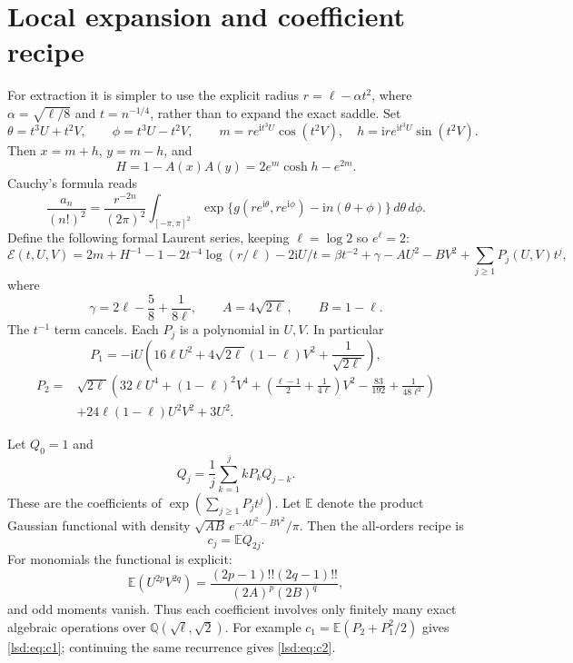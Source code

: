 \documentclass[11pt]{article}
\newcommand{\E}{\mathbb E}
\newcommand{\ii}{\mathrm i}
\theoremstyle{remark}\newtheorem{remark}{Remark}
\begin{document}
\section{Local expansion and coefficient recipe}
For extraction it is simpler to use the explicit radius
$r=\ell-\alpha t^2$, where $\alpha=\sqrt{\ell/8}$ and $t=n^{-1/4}$, rather than to expand the exact saddle.
Set
\[
 \theta=t^3U+t^2V,\qquad \phi=t^3U-t^2V,
 \qquad m=r e^{\ii t^3U}\cos(t^2V),\quad h=\ii r e^{\ii t^3U}\sin(t^2V).
\]
Then $x=m+h$, $y=m-h$, and
\[
 H=1-A(x)A(y)=2e^m\cosh h-e^{2m}.
\]
Cauchy's formula reads
\[
 \frac{a_n}{(n!)^2}=\frac{r^{-2n}}{(2\pi)^2}
 \int_{[-\pi,\pi]^2}\exp\{g(re^{\ii\theta},re^{\ii\phi})-\ii n(\theta+\phi)\}\,d\theta\,d\phi.
\]
Define the following formal Laurent series, keeping $\ell=\log2$ so $e^\ell=2$:
\begin{equation}\label{lsd:eq:formal}
 \mathcal E(t,U,V)=2m+H^{-1}-1
       -2t^{-4}\log(r/\ell)-2\ii U/t
 =\beta t^{-2}+\gamma-AU^2-BV^2+\sum_{j\geq1}P_j(U,V)t^j,
\end{equation}
where
\[
 \gamma=2\ell-\frac58+\frac1{8\ell},\qquad
 A=4\sqrt{2\ell},\qquad B=1-\ell.
\]
The $t^{-1}$ term cancels. Each $P_j$ is a polynomial in $U,V$. In particular
\[
 P_1=-\ii U\left(16\ell U^2+4\sqrt{2\ell}(1-\ell)V^2+\frac1{\sqrt{2\ell}}\right),
\]
\begin{align*}
 P_2={}&\sqrt{2\ell}\left(32\ell U^4+(1-\ell)^2V^4+
 \left(\frac{\ell-1}{2}+\frac1{4\ell}\right)V^2-\frac{83}{192}+\frac1{48\ell^2}\right)\\
 &+24\ell(1-\ell)U^2V^2+3U^2.
\end{align*}

Let $Q_0=1$ and
\begin{equation}\label{lsd:eq:Q}
 Q_j=\frac1j\sum_{k=1}^j kP_kQ_{j-k}.
\end{equation}
These are the coefficients of $\exp(\sum_{j\geq1}P_jt^j)$.
Let $\E$ denote the product Gaussian functional with density
$\sqrt{AB}\,e^{-AU^2-BV^2}/\pi$. Then the all-orders recipe is
\begin{equation}\label{lsd:eq:recipe}
 c_j=\E Q_{2j}.
\end{equation}
For monomials the functional is explicit:
\[
 \E(U^{2p}V^{2q})=\frac{(2p-1)!!(2q-1)!!}{(2A)^p(2B)^q},
\]
and odd moments vanish. Thus each coefficient involves only finitely many exact algebraic operations over $\mathbb Q(\sqrt\ell,\sqrt2)$.
For example $c_1=\E(P_2+P_1^2/2)$ gives \eqref{lsd:eq:c1}; continuing the same recurrence gives \eqref{lsd:eq:c2}.
\end{document}
